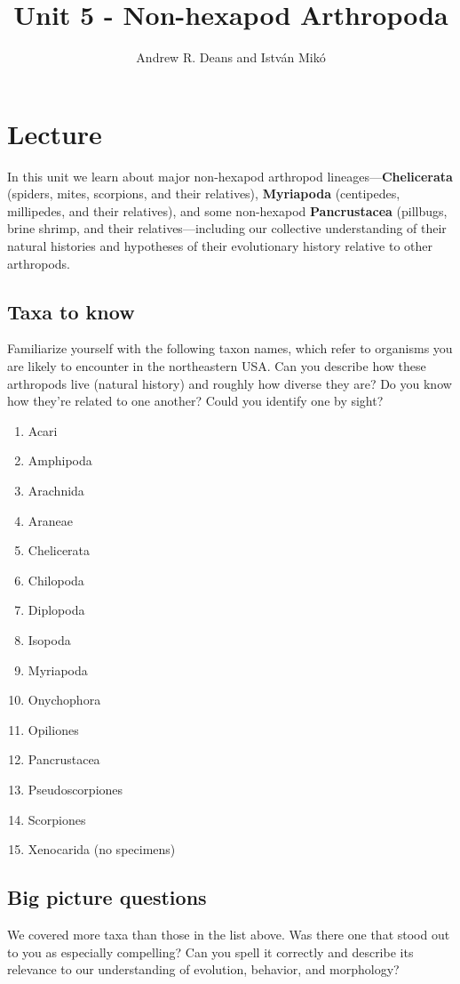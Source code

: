 \documentclass[letterpaper, 11pt]{article}
\title{Unit 5 - Non-hexapod Arthropoda}
\author{Andrew R. Deans and Istv\'an Mik\'o}
\begin{document}
\cleanlookdateon %
\maketitle
\thispagestyle{fancy}
\section{Lecture}
In this unit we learn about major non-hexapod arthropod lineages---\textbf{Chelicerata} (spiders, mites, scorpions, and their relatives), \textbf{Myriapoda} (centipedes, millipedes, and their relatives), and some non-hexapod \textbf{Pancrustacea} (pillbugs, brine shrimp, and their relatives---including our collective understanding of their natural histories and hypotheses of their evolutionary history relative to other arthropods.

\subsection*{Taxa to know}
Familiarize yourself with the following taxon names, which refer to organisms you are likely to encounter in the northeastern USA. Can you describe how these arthropods live (natural history) and roughly how diverse they are? Do you know how they're related to one another? Could you identify one by sight?

\begin{multicols}{2}
\begin{enumerate} 
\item{Acari}
\item{Amphipoda}
\item{Arachnida}  
\item{Araneae}  
\item{Chelicerata} 
\item{Chilopoda}
\item{Diplopoda}
\item{Isopoda}  
\item{Myriapoda}
\item{Onychophora} 
\item{Opiliones}  
\item{Pancrustacea} 
\item{Pseudoscorpiones} 
\item{Scorpiones}
\item{Xenocarida (no specimens)}  
\end{enumerate}
\end{multicols}

\subsection*{Big picture questions}
\noindent{}We covered more taxa than those in the list above. Was there one that stood out to you as especially compelling? Can you spell it correctly and describe its relevance to our understanding of evolution, behavior, and morphology?\\
\end{document}
